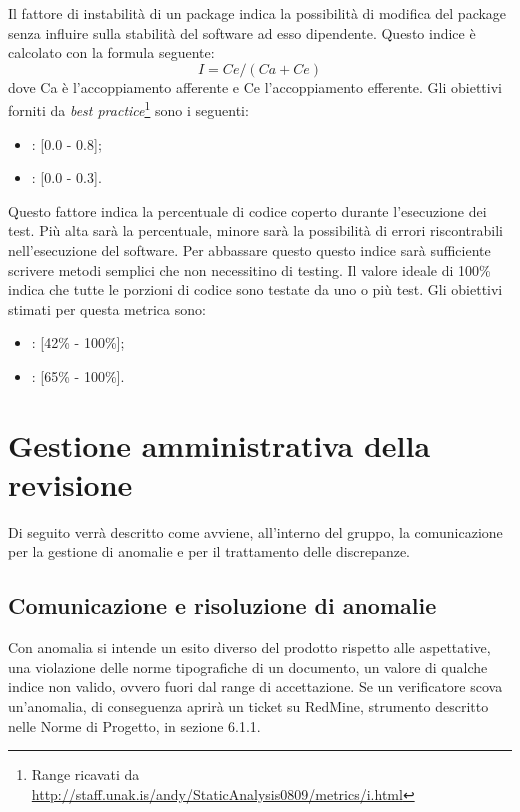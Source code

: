 \label{4.2.8}
Il fattore di instabilità di un package indica la possibilità di modifica del package senza influire sulla stabilità del software ad esso dipendente.
Questo indice è calcolato con la formula seguente:
$$I = Ce / (Ca + Ce)$$
dove Ca è l'accoppiamento afferente e Ce l'accoppiamento efferente.
Gli obiettivi forniti da \emph{best practice}\footnote{Range ricavati da \url{http://staff.unak.is/andy/StaticAnalysis0809/metrics/i.html}} sono i seguenti:
\begin{itemize}
\item {}: [0.0 - 0.8];
\item {}: [0.0 - 0.3].
\end{itemize}

\label{4.2.9}
Questo fattore indica la percentuale di codice coperto durante l'esecuzione dei test. Più alta sarà la percentuale, minore sarà la possibilità di errori riscontrabili nell'esecuzione del software. Per abbassare questo questo indice sarà sufficiente scrivere metodi semplici che non necessitino di testing. Il valore ideale di 100\% indica che tutte le porzioni di codice sono testate da uno o più test.
Gli obiettivi stimati per questa metrica sono:
\begin{itemize}
\item {}: [42\% - 100\%];
\item {}: [65\% - 100\%].
\end{itemize}



\newpage
\section{Gestione amministrativa della revisione}
Di seguito verrà descritto come avviene, all'interno del gruppo, la comunicazione per la gestione di anomalie e per il trattamento delle discrepanze.
\label{3.0}
\subsection{Comunicazione e risoluzione di anomalie}
Con anomalia si intende un esito diverso del prodotto rispetto alle aspettative, una violazione delle norme tipografiche di un documento, un valore di qualche indice non valido, ovvero fuori dal range di accettazione. 
Se un verificatore scova un'anomalia, di conseguenza aprirà un ticket su RedMine, strumento descritto nelle Norme di Progetto, in sezione 6.1.1.
\label{3.1}
